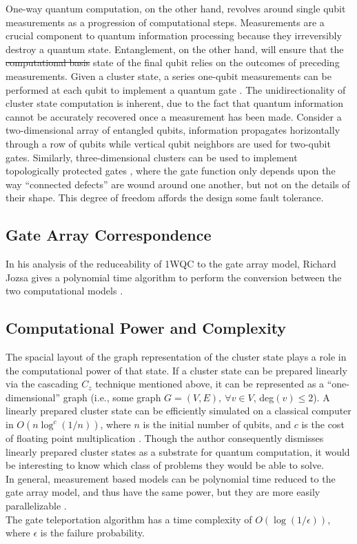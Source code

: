 \documentclass[twocolumn]{IEEEtran11}
\newcommand{\clb}{\color{blue}}
\newcommand{\clbl}{\color{black}}
\begin{document}
\clbl One-way quantum computation, \clb on the other hand\clbl, revolves around single qubit measurements as a progression of computational steps. Measurements are a crucial component to quantum information \clb processing \clbl because they irreversibly destroy a quantum state. Entanglement, on the other hand, will ensure that the \sout{computational basis} \clb state \clbl of the final qubit relies on the outcomes of preceding measurements. Given a cluster state, a series one-qubit measurements can be performed at each qubit to implement a quantum gate \cite{jorrand2005unifying}.  The unidirectionality of cluster state computation is inherent, due to the fact that quantum information cannot be accurately recovered once a measurement has been made. Consider a two-dimensional array of entangled qubits, information propagates horizontally through a row of qubits while vertical qubit neighbors are used for two-qubit gates. \clb Similarly, three-dimensional clusters can be used to implement topologically protected gates \cite{raussendorf2007topological}, where the gate function only depends upon the way ``connected defects'' are wound around one another, but not on the details of their shape. This degree of freedom affords the design some fault tolerance.\clbl


\subsection{Gate Array Correspondence}
In his analysis of the reduceability of 1WQC to the gate array model, Richard Jozsa gives a polynomial time algorithm to perform the conversion between the two computational models \cite{jozsa2006introduction}. 

\subsection{Computational Power and Complexity}
The spacial layout of the graph representation of the cluster state plays a role in the computational power of that state. If a cluster state can be prepared linearly via the cascading $C_z$ technique mentioned above, it can be represented as a  ``one-dimensional'' graph (i.e., some graph $G=(V,E),\ \forall v\in V$, deg$(v)\leq 2$). A linearly prepared cluster state can be efficiently simulated on a classical computer in $O(n\log ^c (1/n))$, where $n$ is the initial number of qubits, and $c$ is the cost of floating point multiplication \cite{nielsen2006cluster}. Though the author consequently dismisses linearly prepared cluster states as a substrate for quantum computation, it would be interesting to know which class of problems they would be able to solve. \\
In general, measurement based models can be polynomial time reduced to the gate array model, and thus have the same power, but they are more easily parallelizable \cite{jozsa2006introduction}.\\
The gate teleportation algorithm \cite{nielsen108020universal} has a time complexity of $O(\log (1/\epsilon))$, where $\epsilon$ is the failure probability. 
\end{document}
